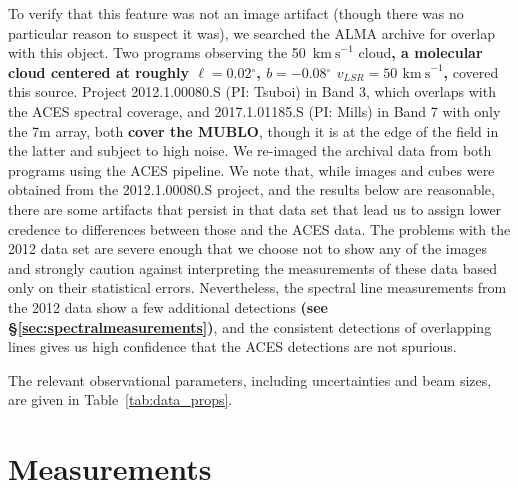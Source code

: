 \documentclass[]{aastex631}
\newcommand{\kms}{\ensuremath{\mathrm{km~s}^{-1}}\xspace}
\renewcommand{\deg}{\ensuremath{^{\circ}}\xspace}
\def\rr#1{\textbf{#1}}
\begin{document}
To verify that this feature was not an image artifact (though there was no particular reason to suspect it was), we searched the ALMA archive for overlap with this object.
Two programs observing the 50~\kms cloud\rr{, a molecular cloud centered at roughly $\ell=0.02\deg$, $b=-0.08\deg$ $v_{LSR}=50$ \kms \citep{Tsuboi2009},} covered this source.
Project 2012.1.00080.S (PI: Tsuboi) in Band 3, which overlaps with the ACES spectral coverage, and 2017.1.01185.S (PI: Mills) in Band 7 with only the 7m array, both \rr{cover the MUBLO}, though it is at the edge of the field in the latter and subject to high noise.
We re-imaged the archival data from both programs using the ACES pipeline.
We note that, while images and cubes were obtained from the 2012.1.00080.S project, and the results below are reasonable, there are some artifacts that persist in that data set that lead us to assign lower credence to differences between those and the ACES data.
The problems with the 2012 data set are severe enough that we choose not to show any of the images and strongly caution against interpreting the measurements of these data based only on their statistical errors.
Nevertheless, the spectral line measurements from the 2012 data show a few additional detections \rr{(see \S \ref{sec:spectralmeasurements})}, and the consistent detections of overlapping lines gives us high confidence that the ACES detections are not spurious.

The relevant observational parameters, including uncertainties and beam sizes, are given in Table~\ref{tab:data_props}.




\section{Measurements}
\label{sec:measurements}
\end{document}
